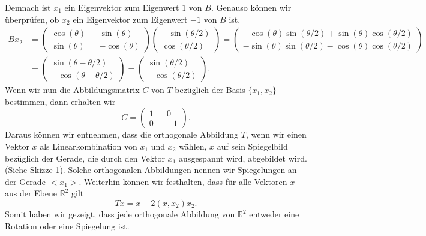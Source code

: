 Demnach ist $x_1$ ein Eigenvektor zum Eigenwert $1$ von $B$. Genauso können wir überprüfen, ob $x_2$ ein Eigenvektor zum Eigenwert $-1$ von $B$ ist.
\begin{align*}
	Bx_2 &= \begin{pmatrix}
		\cos(\theta) && \sin(\theta) \\
		\sin(\theta) && -\cos(\theta)
	\end{pmatrix} \begin{pmatrix}
		-\sin(\theta/2) \\
		\cos(\theta/2)
	\end{pmatrix} = \begin{pmatrix}
		-\cos(\theta)\sin(\theta/2)+\sin(\theta)\cos(\theta/2) \\
		-\sin(\theta)\sin(\theta/2)-\cos(\theta)\cos(\theta/2)
	\end{pmatrix} \\ &= \begin{pmatrix}
		\sin(\theta - \theta/2) \\
		-\cos(\theta - \theta/2)
	\end{pmatrix} = \begin{pmatrix}
		\sin(\theta/2) \\
		-\cos(\theta/2)
	\end{pmatrix}.
\end{align*}
Wenn wir nun die Abbildungsmatrix $C$ von $T$ bezüglich der Basis $\{x_1,x_2\}$ bestimmen, dann erhalten wir
$$C = \begin{pmatrix}
	1 && 0 \\
	0 && -1
\end{pmatrix}.$$
Daraus können wir entnehmen, dass die orthogonale Abbildung $T$, wenn wir einen Vektor $x$ als Linearkombination von $x_1$ und $x_2$ wählen, $x$ auf sein Spiegelbild bezüglich der Gerade, die durch den Vektor $x_1$ ausgespannt wird, abgebildet wird. (Siehe Skizze 1). Solche orthogonalen Abbildungen nennen wir Spiegelungen an der Gerade $<x_1>$. Weiterhin können wir festhalten, dass für alle Vektoren $x$ aus der Ebene $\mathbb{R}^2$ gilt
$$Tx = x - 2(x,x_2)x_2.$$
Somit haben wir gezeigt, dass jede orthogonale Abbildung von $\mathbb{R}^2$ entweder eine Rotation oder eine Spiegelung ist.